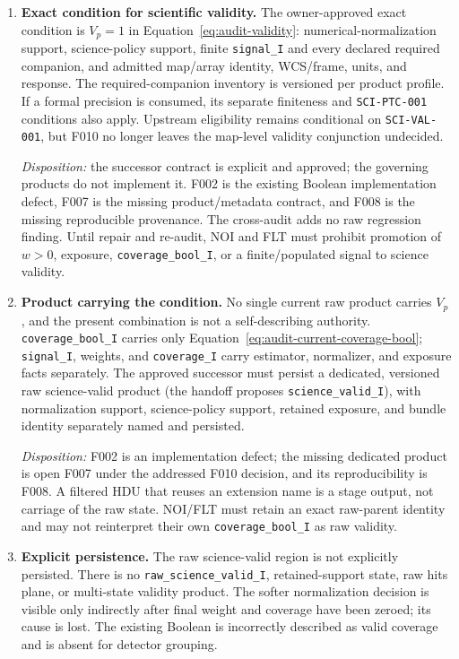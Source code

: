 \documentclass[11pt]{article}
\newcommand{\code}[1]{\nolinkurl{#1}}
\begin{document}
\begin{enumerate}[leftmargin=*,label=\arabic*.]
\raggedright

\item \textbf{Exact condition for scientific validity.}
The owner-approved exact condition is \(V_p=1\) in
Equation~\eqref{eq:audit-validity}: numerical-normalization support,
science-policy support, finite \code{signal_I} and every declared required
companion, and admitted map/array identity, WCS/frame, units, and response.
The required-companion inventory is versioned per product profile.  If a
formal precision is consumed, its separate finiteness and
\code{SCI-PTC-001} conditions also apply.  Upstream eligibility remains
conditional on \code{SCI-VAL-001}, but F010 no longer leaves the map-level
validity conjunction undecided.

\emph{Disposition:} the successor contract is explicit and approved; the
governing products do not implement it.  F002 is the existing Boolean
implementation defect, F007 is the missing product/metadata contract, and F008
is the missing reproducible provenance.  The cross-audit adds no raw
regression finding.  Until repair and re-audit, NOI and FLT must prohibit
promotion of \(w>0\), exposure, \code{coverage_bool_I}, or a finite/populated
signal to science validity.

\item \textbf{Product carrying the condition.}
No single current raw product carries \(V_p\), and the present combination is
not a self-describing authority.  \code{coverage_bool_I} carries only
Equation~\eqref{eq:audit-current-coverage-bool}; \code{signal_I}, weights, and
\code{coverage_I} carry estimator, normalizer, and exposure facts separately.
The approved successor must persist a dedicated, versioned raw science-valid
product (the handoff proposes \code{science_valid_I}), with normalization
support, science-policy support, retained exposure, and bundle identity
separately named and persisted.

\emph{Disposition:} F002 is an implementation defect; the missing dedicated
product is open F007 under the addressed F010 decision, and its reproducibility
is F008.  A
filtered HDU that reuses an extension name is a stage output, not carriage of
the raw state.  NOI/FLT must retain an exact raw-parent identity and may not
reinterpret their own \code{coverage_bool_I} as raw validity.

\item \textbf{Explicit persistence.}
The raw science-valid region is not explicitly persisted.  There is no
\code{raw_science_valid_I}, retained-support state, raw hits plane, or
multi-state validity product.  The softer normalization decision is visible
only indirectly after final weight and coverage have been zeroed; its cause is
lost.  The existing Boolean is incorrectly described as valid coverage and is
absent for detector grouping.


\end{enumerate}
\end{document}
